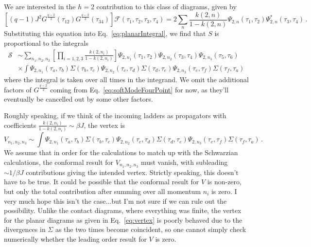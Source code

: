 \documentclass[aps,prx,preprint,onecolumn,citeautoscript,footinbib]{revtex4-1}
\begin{document}
We are interested in the $h=2$ contribution to this class of diagrams, given by
\begin{equation}
 \left[(q-1) J^2 G^{\frac{q-2}{2}}(\tau_{12})  G^{\frac{q-2}{2}}(\tau_{34})\right] \mathcal{F}(\tau_1, \tau_2, \tau_3, \tau_4) = 2 \sum_n \frac{k(2, n)}{1-k(2, n)} \Psi_{2, n}(\tau_1, \tau_2) \Psi_{2, n}^*(\tau_3, \tau_4)\,.
 \label{eq:softModeFourPoint}
\end{equation}
Substituting this equation into Eq.~\ref{eq:planarIntegral}, we find that $S$ is proportional to the integrals
\begin{equation}
\begin{aligned}
    \mathcal{S} &\sim \sum_{n_1, n_2, n_3} \left[\prod_{i=1,2,3}\frac{k(2, n_i)}{1-k(2, n_i)}\right]\Psi_{2, n_1}(\tau_1, \tau_2) \Psi_{2, n_2}(\tau_3, \tau_4) \Psi_{2, n_3}(\tau_5, \tau_6)
    \\
    &\times \int \Psi_{2, n_1}(\tau_a, \tau_b) \Sigma(\tau_b, \tau_c) \Psi_{2, n_2}(\tau_c, \tau_d) \Sigma(\tau_d, \tau_e) \Psi_{2, n_3}(\tau_e, \tau_f)\Sigma(\tau_f, \tau_a)
    \end{aligned}
\end{equation}
where the integral is taken over all times in the integrand. We omit the additional factors of $G^{\frac{q-2}{2}}$ coming from Eq.~\ref{eq:softModeFourPoint} for now, as they'll eventually be cancelled out by some other factors. 

Roughly speaking, if we think of the incoming ladders as propagators with coefficients $\frac{k(2, n_i)}{1-k(2, n_i)} \sim \beta J$, the vertex is
\begin{equation}
    V_{n_1, n_2, n_3} \sim \int \Psi_{2, n_1}(\tau_a, \tau_b) \Sigma(\tau_b, \tau_c) \Psi_{2, n_2}(\tau_c, \tau_d) \Sigma(\tau_d, \tau_e) \Psi_{2, n_3}(\tau_e, \tau_f)\Sigma(\tau_f, \tau_a)\,.
    \label{eq:vertex}
\end{equation}
We assume that in order for the calculations to match up with the Schwarzian calculations, the conformal result for $V_{n_1, n_2, n_3}$ must vanish, with subleading $\sim 1/\beta J$ contributions giving the intended vertex. Strictly speaking, this doesn't have to be true. It could be possible that the conformal result for $V$ is non-zero, but only the total contribution after summing over all momentum $n_i$ is zero. I very much hope this isn't the case...but I'm not sure if we can rule out the possibility. Unlike the contact diagrams, where everything was finite, the vertex for the planar diagrams as given in Eq.~\ref{eq:vertex} is poorly behaved due to the divergences in $\Sigma$ as the two times become coincident, so one cannot simply check numerically whether the leading order result for $V$ is zero.
\end{document}
